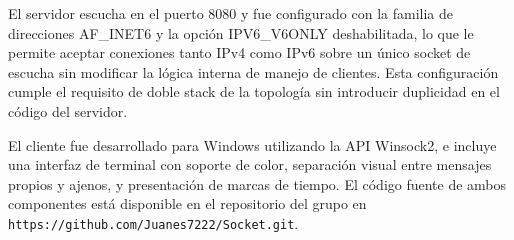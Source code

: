 El servidor escucha en el puerto 8080 y fue configurado con la familia de
direcciones AF\_INET6 y la opción IPV6\_V6ONLY deshabilitada, lo que le
permite aceptar conexiones tanto IPv4 como IPv6 sobre un único socket de
escucha sin modificar la lógica interna de manejo de clientes. Esta
configuración cumple el requisito de doble stack de la topología sin
introducir duplicidad en el código del servidor.

El cliente fue desarrollado para Windows utilizando la API Winsock2, e incluye
una interfaz de terminal con soporte de color, separación visual entre mensajes
propios y ajenos, y presentación de marcas de tiempo. El código fuente de ambos componentes está disponible en el
repositorio del grupo en \texttt{https://github.com/Juanes7222/Socket.git}.